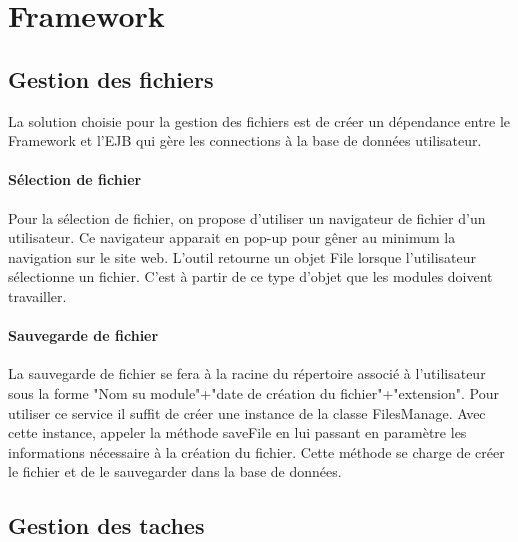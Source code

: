 \section{Framework}

\subsection{Gestion des fichiers}

La solution choisie pour la gestion des fichiers est de créer un dépendance entre le Framework et l'EJB qui gère les connections à la base de données utilisateur.\\

\paragraph*{Sélection de fichier}

Pour la sélection de fichier, on propose d'utiliser un navigateur de fichier d'un utilisateur. Ce navigateur apparait en pop-up pour gêner au minimum la navigation sur le site web. L'outil retourne un objet File lorsque l'utilisateur sélectionne un fichier. C'est à partir de ce type d'objet que les modules doivent travailler.\\

\paragraph*{Sauvegarde de fichier}

La sauvegarde de fichier se fera à la racine du répertoire associé à l'utilisateur sous la forme "Nom su module"+"date de création du fichier"+"extension". Pour utiliser ce service il suffit de créer une instance de la classe FilesManage. Avec cette instance, appeler la méthode saveFile en lui passant en paramètre les informations nécessaire à la création du fichier. Cette méthode se charge de créer le fichier et de le sauvegarder dans la base de données.\\

\subsection{Gestion des taches}

